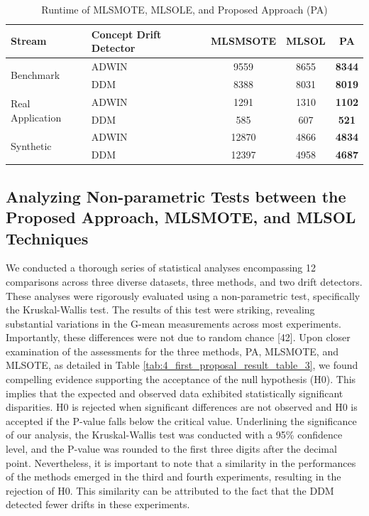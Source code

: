 \begin{table}[h!]
  \centering
  \begin{tabular}{|l|l|c|c|c|}
  \hline
  \textbf{Stream} & \textbf{Concept Drift Detector} & \textbf{MLSMSOTE} & \textbf{MLSOL} & \textbf{PA} \\ \hline
  \multirow{2}{*}{Benchmark} & ADWIN & 9559 & 8655 & \textbf{8344} \\ \cline{2-5} 
   & DDM & 8388 & 8031 & \textbf{8019} \\ \hline
  \multirow{2}{*}{Real Application} & ADWIN & 1291 & 1310 & \textbf{1102} \\ \cline{2-5} 
   & DDM & 585 & 607 & \textbf{521} \\ \hline
  \multirow{2}{*}{Synthetic} & ADWIN & 12870 & 4866 & \textbf{4834} \\ \cline{2-5} 
   & DDM & 12397 & 4958 & \textbf{4687} \\ \hline
  \end{tabular}
  \caption{Runtime of MLSMOTE, MLSOLE, and Proposed Approach (PA)}
  \label{tab:4_first_proposal_result_table_2}
  \end{table}

\subsection{Analyzing Non-parametric Tests between the Proposed Approach, MLSMOTE, and MLSOL Techniques}
We conducted a thorough series of statistical analyses encompassing 12 comparisons across three diverse datasets, three methods, and two drift detectors. These analyses were rigorously evaluated using a non-parametric test, specifically the Kruskal-Wallis test. The results of this test were striking, revealing substantial variations in the G-mean measurements across most experiments. Importantly, these differences were not due to random chance [42]. Upon closer examination of the assessments for the three methods, PA, MLSMOTE, and MLSOTE, as detailed in Table \ref{tab:4_first_proposal_result_table_3}, we found compelling evidence supporting the acceptance of the null hypothesis (H0).
This implies that the expected and observed data exhibited statistically significant disparities. H0 is rejected when significant differences are not observed and H0 is accepted if the P-value falls below the critical value. Underlining the significance of our analysis, the Kruskal-Wallis test was conducted with a 95\% confidence level, and the P-value was rounded to the first three digits after the decimal point. Nevertheless, it is important to note that a similarity in the performances of the methods emerged in the third and fourth experiments, resulting in the rejection of H0. This similarity can be attributed to the fact that the DDM detected fewer drifts in these experiments.


